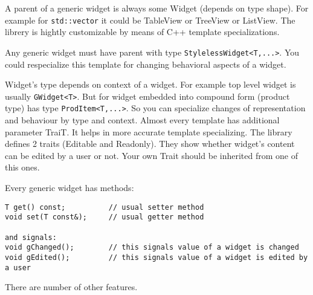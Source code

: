 \documentclass[a4paper]{article}
\begin{document}
A parent of a generic widget is always some Widget (depends on type shape).
For example for \lstinline$std::vector$ it could be TableView or TreeView or ListView.
The librery is hightly customizable by means of C++ template specializations.

Any generic widget must have parent with type \lstinline$StylelessWidget<T,...>$.
You could respecialize this template for changing behavioral aspects of a widget.

Widget's type depends on context of a widget. For example top level widget is usually \lstinline$GWidget<T>$.
But for widget embedded into compound form (product type) has type \lstinline$ProdItem<T,...>$.
So you can specialize changes of representation and behaviour by type and context.
Almost every template has additional parameter TraiT. It helps in more accurate template specializing.
The library defines 2 traits (Editable and Readonly). They show whether widget's content can be edited by a user or not.
Your own Trait should be inherited from one of this ones.

Every generic widget has methods:

\begin{lstlisting}
T get() const;			// usual setter method
void set(T const&);		// usual getter method

and signals:
void gChanged();		// this signals value of a widget is changed
void gEdited();			// this signals value of a widget is edited by a user
\end{lstlisting}

There are number of other features.
\end{document}
